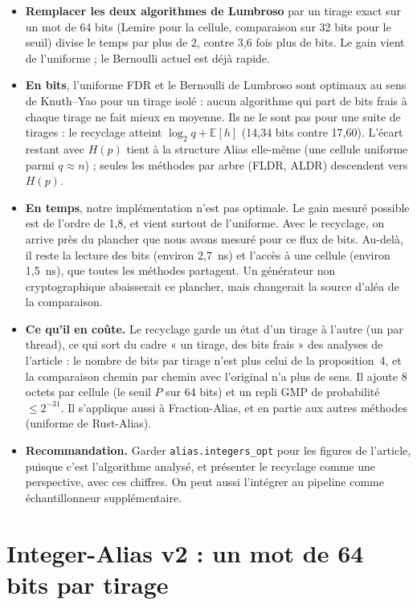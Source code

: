\documentclass[11pt,a4paper]{article}
\newcommand{\code}[1]{\texttt{#1}}
\begin{document}
\begin{itemize}
\item \textbf{Remplacer les deux algorithmes de Lumbroso} par un tirage exact sur un mot
  de 64 bits (Lemire pour la cellule, comparaison sur 32 bits pour le seuil) divise le
  temps par plus de 2, contre 3,6 fois plus de bits. Le gain vient de l'uniforme ; le
  Bernoulli actuel est déjà rapide.
\item \textbf{En bits}, l'uniforme FDR et le Bernoulli de Lumbroso sont optimaux au sens
  de Knuth--Yao pour un tirage isolé : aucun algorithme qui part de bits frais à chaque
  tirage ne fait mieux en moyenne. Ils ne le sont pas pour une suite de tirages : le
  recyclage atteint $\log_2 q + \mathbb{E}[h]$ (14,34 bits contre 17,60). L'écart
  restant avec $H(p)$ tient à la structure Alias elle-même (une cellule uniforme parmi
  $q \approx n$) ; seules les méthodes par arbre (FLDR, ALDR) descendent vers $H(p)$.
\item \textbf{En temps}, notre implémentation n'est pas optimale. Le gain mesuré
  possible est de l'ordre de 1,8, et vient surtout de l'uniforme. Avec le recyclage, on
  arrive près du plancher que nous avons mesuré pour ce flux de bits. Au-delà, il reste
  la lecture des bits (environ 2,7~ns) et l'accès à une cellule (environ 1,5~ns), que
  toutes les méthodes partagent. Un générateur non cryptographique abaisserait ce
  plancher, mais changerait la source d'aléa de la comparaison.
\item \textbf{Ce qu'il en coûte.} Le recyclage garde un état d'un tirage à l'autre (un
  par thread), ce qui sort du cadre « un tirage, des bits frais » des analyses de
  l'article : le nombre de bits par tirage n'est plus celui de la proposition~4, et la
  comparaison chemin par chemin avec l'original n'a plus de sens. Il ajoute 8 octets par
  cellule (le seuil $P$ sur 64 bits) et un repli GMP de probabilité $\le 2^{-31}$.
  Il s'applique aussi à Fraction-Alias, et en partie aux autres méthodes (uniforme de
  Rust-Alias).
\item \textbf{Recommandation.} Garder \code{alias.integers\_opt} pour les figures de
  l'article, puisque c'est l'algorithme analysé, et présenter le recyclage comme une
  perspective, avec ces chiffres. On peut aussi l'intégrer au pipeline comme
  échantillonneur supplémentaire.
\end{itemize}

\section{Integer-Alias v2 : un mot de 64 bits par tirage}
\label{sec:v2}
\end{document}
